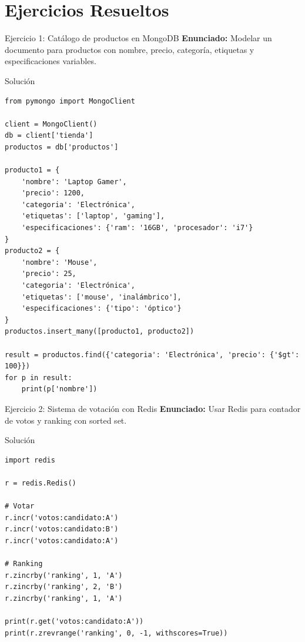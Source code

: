 \documentclass[aspectratio=169, 10pt, xcolor=table]{beamer}
\begin{document}
\section{Ejercicios Resueltos}

\begin{frame}[fragile]{Ejercicio 1: Catálogo de productos en MongoDB}
    \textbf{Enunciado:} Modelar un documento para productos con nombre, precio, categoría, etiquetas y especificaciones variables.
    \begin{block}{Solución}
        \begin{lstlisting}[style=python]
from pymongo import MongoClient

client = MongoClient()
db = client['tienda']
productos = db['productos']

producto1 = {
    'nombre': 'Laptop Gamer',
    'precio': 1200,
    'categoria': 'Electrónica',
    'etiquetas': ['laptop', 'gaming'],
    'especificaciones': {'ram': '16GB', 'procesador': 'i7'}
}
producto2 = {
    'nombre': 'Mouse',
    'precio': 25,
    'categoria': 'Electrónica',
    'etiquetas': ['mouse', 'inalámbrico'],
    'especificaciones': {'tipo': 'óptico'}
}
productos.insert_many([producto1, producto2])

result = productos.find({'categoria': 'Electrónica', 'precio': {'$gt': 100}})
for p in result:
    print(p['nombre'])
        \end{lstlisting}
    \end{block}
\end{frame}

\begin{frame}[fragile]{Ejercicio 2: Sistema de votación con Redis}
    \textbf{Enunciado:} Usar Redis para contador de votos y ranking con sorted set.
    \begin{block}{Solución}
        \begin{lstlisting}[style=python]
import redis

r = redis.Redis()

# Votar
r.incr('votos:candidato:A')
r.incr('votos:candidato:B')
r.incr('votos:candidato:A')

# Ranking
r.zincrby('ranking', 1, 'A')
r.zincrby('ranking', 2, 'B')
r.zincrby('ranking', 1, 'A')

print(r.get('votos:candidato:A'))
print(r.zrevrange('ranking', 0, -1, withscores=True))
        \end{lstlisting}
    \end{block}
\end{frame}
\end{document}
